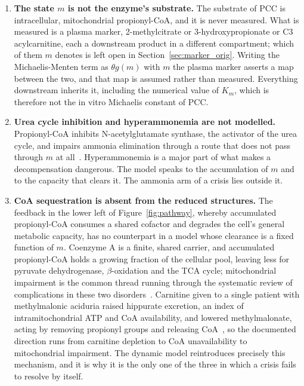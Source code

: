 \begin{enumerate}[leftmargin=*, itemsep=3pt]
\item \textbf{The state $m$ is not the enzyme's substrate.} The substrate of PCC is
intracellular, mitochondrial propionyl-CoA, and it is never measured. What is measured is a
plasma marker, 2-methylcitrate or 3-hydroxypropionate or C3 acylcarnitine, each a
downstream product in a different compartment; which of them $m$ denotes is left open in
Section~\ref{sec:marker_orig}. Writing the Michaelis-Menten term as $\theta g(m)$
with $m$ the plasma marker asserts a map between the two, and that map is assumed rather
than measured. Everything downstream inherits it, including the numerical value of $K_m$,
which is therefore not the in vitro Michaelis constant of PCC.
\item \textbf{Urea cycle inhibition and hyperammonemia are not modelled.} Propionyl-CoA
inhibits N-acetylglutamate synthase, the activator of the urea cycle, and impairs ammonia
elimination through a route that does not pass through $m$ at
all~\cite{pathophys_complications}. %
Hyperammonemia is a major part of what makes a decompensation dangerous. The model speaks
to the accumulation of $m$ and to the capacity that clears it. The ammonia arm of a crisis
lies outside it.
\item \textbf{CoA sequestration is absent from the reduced structures.} The feedback in the
lower left of Figure~\ref{fig:pathway}, whereby accumulated propionyl-CoA consumes a
shared cofactor and
degrades the cell's general metabolic capacity, has no counterpart in a model whose
clearance is a fixed function of $m$. Coenzyme A is a finite, shared carrier, and
accumulated propionyl-CoA holds a growing fraction of the cellular pool, leaving less for
pyruvate dehydrogenase, $\beta$-oxidation and the TCA cycle; mitochondrial impairment is
the common thread running through the systematic review of complications in these two
disorders~\cite{pathophys_complications}. %
Carnitine given to a single patient with methylmalonic aciduria raised hippurate excretion,
an index of intramitochondrial ATP and CoA availability, and lowered methylmalonate, acting
by removing propionyl groups and releasing CoA~\cite{coa_sequestration}, %
so the documented direction runs from carnitine depletion to CoA unavailability to
mitochondrial impairment.
The dynamic model reintroduces precisely this mechanism, and it is why it is the only one of the
three in which a crisis fails to resolve by itself.
\end{enumerate}

